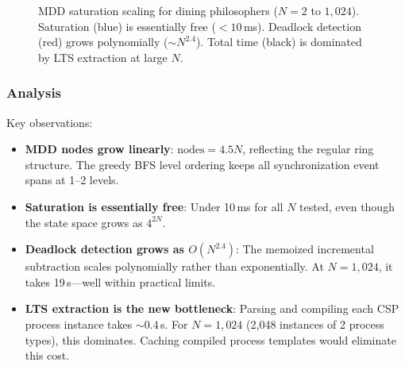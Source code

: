 \documentclass[11pt]{article}
\begin{document}
\begin{figure}[ht]
\centering
{}
\caption{MDD saturation scaling for dining philosophers ($N = 2$ to
$1{,}024$).  Saturation (blue) is essentially free ($< 10$\,ms).
Deadlock detection (red) grows polynomially ($\sim N^{2.4}$).
Total time (black) is dominated by LTS extraction at large $N$.}
\label{fig:scaling}
\end{figure}

\subsubsection{Analysis}

Key observations:
\begin{itemize}
\item \textbf{MDD nodes grow linearly}: $\text{nodes} = 4.5N$, reflecting
  the regular ring structure.  The greedy BFS level ordering keeps all
  synchronization event spans at 1--2 levels.
\item \textbf{Saturation is essentially free}: Under 10\,ms for all
  $N$ tested, even though the state space grows as $4^{2N}$.
\item \textbf{Deadlock detection grows as $O(N^{2.4})$}: The memoized
  incremental subtraction scales polynomially rather than exponentially.
  At $N = 1{,}024$, it takes 19\,s---well within practical limits.
\item \textbf{LTS extraction is the new bottleneck}: Parsing and
  compiling each CSP process instance takes $\sim 0.4$\,s.  For
  $N = 1{,}024$ (2{,}048 instances of 2 process types), this dominates.
  Caching compiled process templates would eliminate this cost.
\end{itemize}
\end{document}
